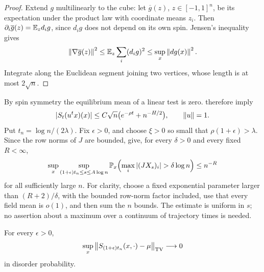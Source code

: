\begin{proof}
Extend $g$ multilinearly to the cube: let $\overline g(z)$,
$z\in[-1,1]^n$, be its expectation under the product law with coordinate
means $z_i$.  Then
$\partial_i\overline g(z)=\mathbb E_z d_ig$, since $d_ig$ does not depend
on its own spin.  Jensen's inequality gives
\[
 \left\lVert \nabla\overline g(z)\right\rVert^2
 \le\mathbb E_z\sum_i(d_ig)^2
 \le\sup_x\left\lVert dg(x)\right\rVert^2.
\]
Integrate along the Euclidean segment joining two vertices, whose
length is at most $2\sqrt n$.
\end{proof}

By spin symmetry the equilibrium mean of a linear test is zero.
 therefore imply
\begin{equation}
 |S_t(u^tx)(x)|
 \le C\sqrt n\bigl(e^{-\rho t}+n^{-H/2}\bigr),
 \qquad \left\lVert u\right\rVert=1.
 \label{eq:cutoff-linear-mean}
\end{equation}
Put $t_n=\log n/(2\lambda)$.  Fix $\epsilon>0$, and choose $\xi>0$
so small that $\rho(1+\epsilon)>\lambda$.  Since the row norms of
$J$ are bounded, 
give, for every $\delta>0$ and every fixed $R<\infty$,
\begin{equation}
 \sup_x\sup_{(1+\epsilon)t_n\le s\le A\log n}
 \P_x\!\left(\max_i|(JX_s)_i|>\delta\log n\right)
 \le n^{-R}
 \label{eq:cutoff-field-tail}
\end{equation}
for all sufficiently large $n$.  For clarity, choose a fixed
exponential parameter larger than $(R+2)/\delta$, with the bounded
row-norm factor included, use that every field mean is $o(1)$, and
then sum the $n$ bounds.  The estimate is uniform in $s$; no assertion
about a maximum over a continuum of trajectory times is needed.

\begin{lemma}
\label{lem:cutoff-upper}
For every $\epsilon>0$,
\[
 \sup_x\left\lVert S_{(1+\epsilon)t_n}(x,\cdot)-\mu\right\rVert_{\operatorname{TV}}
 \longrightarrow0
\]
in disorder probability.
\end{lemma}

